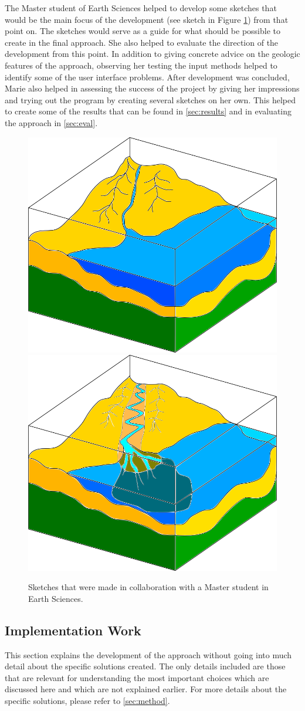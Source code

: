 \documentclass[a4paper,12pt]{report}
\newcommand{\secref}[1]{\autoref{#1}}
\begin{document}
The Master student of Earth Sciences helped to develop some sketches that would be the main focus of the development (see sketch in Figure \ref{fig:illuSketch}) from that point on. The sketches would serve as a guide for what should be possible to create in the final approach. She also helped to evaluate the direction of the development from this point. In addition to giving concrete advice on the geologic features of the approach, observing her testing the input methods helped to identify some of the user interface problems. After development was concluded, Marie also helped in assessing the success of the project by giving her impressions and trying out the program by creating several sketches on her own. This helped to create some of the results that can be found in \secref{sec:results} and in evaluating the approach in \secref{sec:eval}.

\begin{figure}
 \centering
\includegraphics[width=.4\linewidth]{thesis/illuSketch1.png}
\includegraphics[width=.4\linewidth]{thesis/illuSketch2.png}
 \caption{Sketches that were made in collaboration with a Master student in Earth Sciences.}
 \label{fig:illuSketch}
\end{figure}

\subsection{Implementation Work}

This section explains the development of the approach without going into much detail about the specific solutions created. The only details included are those that are relevant for understanding the most important choices which are discussed here and which are not explained earlier. For more details about the specific solutions, please refer to \secref{sec:method}.
\end{document}
